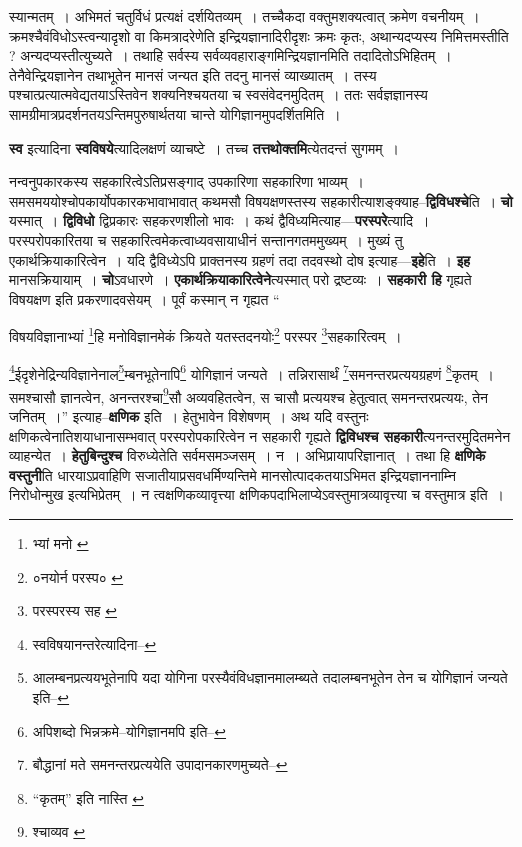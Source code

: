 \documentclass[article,12pt,a4paper]{memoir}
\begin{document}
	  \pstart स्यान्मतम् । अभिमतं चतुर्विधं प्रत्यक्षं दर्शयितव्यम् । तच्चैकदा वक्तुमशक्यत्वात् क्रमेण वचनीयम् । क्रमश्चैवंविधोऽस्त्वन्यादृशो वा किमत्रादरेणेति इन्द्रियज्ञानादिरीदृशः क्रमः कृतः, अथान्यदप्यस्य निमित्तमस्तीति ? अन्यदप्यस्तीत्युच्यते । तथाहि सर्वस्य सर्वव्यवहाराङ्गमिन्द्रियज्ञानमिति तदादितोऽभिहितम् । तेनैवेन्द्रियज्ञानेन तथाभूतेन मानसं जन्यत इति तदनु मानसं व्याख्यातम् । तस्य पश्चात्प्रत्यात्मवेद्यतयाऽस्तिवेन शक्यनिश्चयतया च स्वसंवेदनमुदितम् । ततः सर्वज्ञज्ञानस्य सामग्रीमात्रप्रदर्शनतयऽन्तिमपुरुषार्थतया चान्ते योगिज्ञानमुपदर्शितमिति ।
	\pend
      

	  \pstart \textbf{स्व} इत्यादिना \textbf{स्वविषये}त्यादिलक्षणं व्याचष्टे । तच्च \textbf{तत्तथोक्तमि}त्येतदन्तं सुगमम् ।
	\pend
      

	  \pstart नन्वनुपकारकस्य सहकारित्वेऽतिप्रसङ्गाद् उपकारिणा सहकारिणा भाव्यम् । समसमययोश्चोपकार्योपकारकभावाभावात् कथमसौ विषयक्षणस्तस्य सहकारीत्याशङ्क्याह--\textbf{द्विविधश्चे}ति । \textbf{चो} यस्मात् । \textbf{द्विविधो} द्विप्रकारः सहकरणशीलो भावः । कथं द्वैविध्यमित्याह—\textbf{परस्परे}त्यादि । परस्परोपकारितया च सहकारित्वमेकत्वाध्यवसायाधीनं सन्तानगतममुख्यम् । मुख्यं तु एकार्थक्रियाकारित्वेन । यदि द्वैविध्येऽपि प्राक्तनस्य ग्रहणं तदा तदवस्थो दोष इत्याह—\textbf{इहे}ति । \textbf{इह} मानसक्रियायाम् । \textbf{चो}ऽवधारणे । \textbf{एकार्थक्रियाकारित्वेने}त्यस्मात् परो द्रष्टव्यः । \textbf{सहकारी हि} गृह्यते विषयक्षण इति प्रकरणादवसेयम् । पूर्वं कस्मान् न गृह्यत  \leavevmode{} “
	  
	विषयविज्ञानाभ्यां \footnote{भ्यां मनो \cite{dp-msD} \cite{dp-msB}}\-हि मनोविज्ञानमेकं क्रियते यतस्तदनयोः\footnote{०नयोर्न परस्प० \cite{dp-msA} \cite{dp-msC} \cite{dp-edP} \cite{dp-edH} \cite{dp-edE} \cite{dp-edN}} परस्पर \footnote{परस्परस्य सह \cite{dp-msB} \cite{dp-msD}}\-सहकारित्वम् । 
	  
	\footnote{स्वविषयानन्तरेत्यादिना--\cite{dp-msD-n}}\-ईदृशेनेद्रिन्यविज्ञानेनाल\footnote{आलम्बनप्रत्ययभूतेनापि \cite{dp-msA} \cite{dp-msB} \cite{dp-msC} \cite{dp-msD} \cite{dp-edP} \cite{dp-edH} \cite{dp-edE} \cite{dp-edN} यदा योगिना परस्यैवंविधज्ञानमालम्ब्यते तदालम्बनभूतेन तेन च योगिज्ञानं जन्यते इति--\cite{dp-msD-n}}\-म्बनभूतेनापि\footnote{अपिशब्दो भिन्नक्रमे--योगिज्ञानमपि इति--\cite{dp-msD-n}} योगिज्ञानं जन्यते । तन्निरासार्थं \footnote{बौद्धानां मते समनन्तरप्रत्ययेति उपादानकारणमुच्यते--\cite{dp-msD-n}}\-समनन्तरप्रत्ययग्रहणं \footnote{“कृतम्” इति नास्ति \cite{dp-msD} \cite{dp-msB}}\-कृतम् । समश्चासौ ज्ञानत्वेन, अनन्तरश्चा\footnote{श्चाव्यव \cite{dp-msD} \cite{dp-msB}}\-सौ अव्यवहितत्वेन, स चासौ प्रत्ययश्च हेतुत्वात् समनन्तरप्रत्ययः, तेन जनितम् ।” इत्याह--\textbf{क्षणिक} इति । हेतुभावेन विशेषणम् । अथ यदि वस्तुनः क्षणिकत्वेनातिशयाधानासम्भवात् परस्परोपकारित्वेन न सहकारी गृह्यते \textbf{द्विविधश्च सहकारी}त्यनन्तरमुदितमनेन व्याहन्येत । \textbf{हेतुबिन्दुश्च} विरुध्येतेति सर्वमसमञ्जसम् । न । अभिप्रायापरिज्ञानात् । तथा हि \textbf{क्षणिके वस्तुनी}ति धारयाऽप्रवाहिणि सजातीयाप्रसवधर्मिण्यन्तिमे मानसोत्पादकतयाऽभिमत इन्द्रियज्ञाननाम्नि निरोधोन्मुख इत्यभिप्रेतम् । न त्वक्षणिकव्यावृत्त्या क्षणिकपदाभिलाप्येऽवस्तुमात्रव्यावृत्त्या च वस्तुमात्र इति ।
	\pend
      
\end{document}
